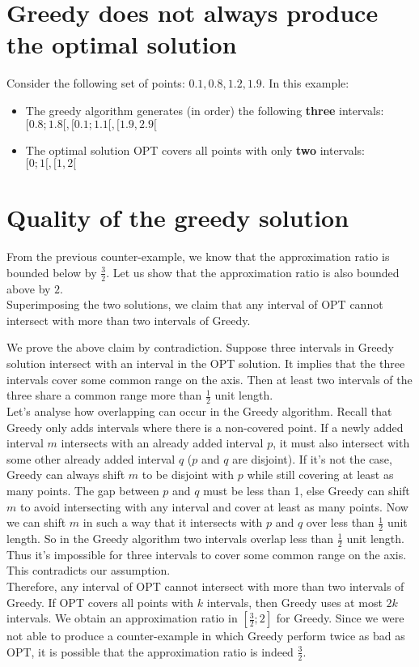 
\section{Greedy does not always produce the optimal solution}

Consider the following set of points: ${0.1, 0.8, 1.2, 1.9}$. In this example:
\begin{itemize}
  \item The greedy algorithm generates (in order) the following \textbf{three} intervals: $[0.8; 1.8[, [0.1; 1.1[, [1.9, 2.9[$
  \item The optimal solution OPT covers all points with only \textbf{two} intervals: $[0; 1[, [1, 2[$
\end{itemize}

\section{Quality of the greedy solution}

From the previous counter-example, we know that the approximation ratio is bounded below by $\frac{3}{2}$. Let us show that the approximation ratio is also bounded above by $2$.\\

Superimposing the two solutions, we claim that any interval of OPT cannot intersect with more than two intervals of Greedy.

We prove the above claim by contradiction. Suppose three intervals in Greedy solution intersect with an interval in the OPT solution. It implies that the three intervals cover some common range on the axis. Then at least two intervals of the three share a common range more than $\frac{1}{2}$ unit length.\\

Let's analyse how overlapping can occur in the Greedy algorithm. Recall that Greedy only adds intervals where there is a non-covered point. If a newly added interval $m$ intersects with an already added interval $p$, it must also intersect with some other already added interval $q$ ($p$ and $q$ are disjoint). If it's not the case, Greedy can always shift $m$ to be disjoint with $p$ while still covering at least as many points. The gap between $p$ and $q$ must be less than 1, else Greedy can shift $m$ to avoid intersecting with any interval and cover at least as many points. Now we can shift $m$ in such a way that it intersects with $p$ and $q$ over less than $\frac{1}{2}$ unit length. So in the Greedy algorithm two intervals overlap less than $\frac{1}{2}$ unit length. Thus it's impossible for three intervals to cover some common range on the axis. This contradicts our assumption.\\

Therefore, any interval of OPT cannot intersect with more than two intervals of Greedy. If OPT covers all points with $k$ intervals, then Greedy uses at most $2k$ intervals. We obtain an approximation ratio in $[\frac{3}{2}; 2]$ for Greedy. Since we were not able to produce a counter-example in which Greedy perform twice as bad as OPT, it is possible that the approximation ratio is indeed $\frac{3}{2}$.
